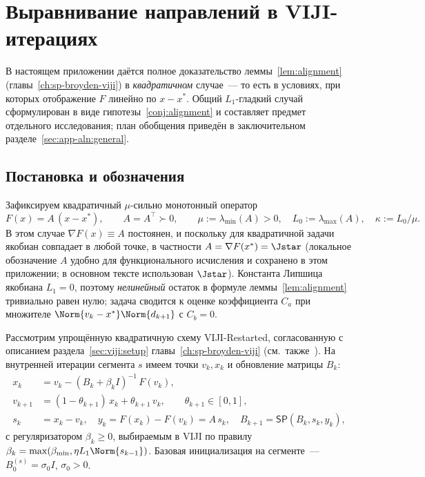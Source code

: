 \chapter{Выравнивание направлений в VIJI-итерациях}\label{app:alignment}

В настоящем приложении даётся полное доказательство
леммы~\ref{lem:alignment} (главы~\ref{ch:sp-broyden-viji})
в \emph{квадратичном} случае~--- то есть в условиях, при которых
отображение $F$ линейно по $x - x^{*}$. Общий $L_1$-гладкий случай
сформулирован в виде гипотезы~\ref{conj:alignment} и составляет
предмет отдельного исследования; план обобщения приведён в
заключительном разделе~\ref{sec:app-aln:general}.

\section{Постановка и обозначения}
\label{sec:app-aln:setup}

Зафиксируем квадратичный $\mu$-сильно монотонный оператор
\begin{equation}
F(x) = A\,(x - x^{*}),
\qquad
A = A^{\top} \succ 0,
\qquad
\mu := \lambda_{\min}(A) > 0,
\quad
L_0 := \lambda_{\max}(A),
\quad
\kappa := L_0/\mu.
\label{eq:app-aln:F}
\end{equation}
В этом случае $\nabla F(x) \equiv A$ постоянен, и поскольку для квадратичной задачи
якобиан совпадает в любой точке, в частности $A = \nabla F(x^{*}) = \Jstar$
(локальное обозначение $A$ удобно для функционального исчисления и сохранено
в этом приложении; в основном тексте использован $\Jstar$). Константа Липшица
якобиана $L_1 = 0$, поэтому \emph{нелинейный} остаток в формуле
леммы~\ref{lem:alignment} тривиально равен нулю; задача сводится к
оценке коэффициента $C_a$ при множителе $\Norm{v_k - x^{*}}\Norm{d_{k+1}}$
с $C_b = 0$.

Рассмотрим упрощённую квадратичную схему VIJI-Restarted, согласованную
с описанием раздела~\ref{sec:viji:setup} главы~\ref{ch:sp-broyden-viji}
(см.~также~\cite[Algorithm~1]{Agafonov2024VIJI}). На внутренней
итерации сегмента $s$ имеем точки $v_k, x_k$ и обновление матрицы $B_k$:
\begin{align}
x_k     &= v_k - (B_k + \beta_k I)^{-1}\, F(v_k), \label{eq:app-aln:x}\\
v_{k+1} &= (1 - \theta_{k+1})\, x_k + \theta_{k+1}\, v_k,
\qquad \theta_{k+1} \in [0, 1], \label{eq:app-aln:v}\\
s_k     &= x_k - v_k, \quad y_k = F(x_k) - F(v_k) = A\,s_k,
\quad B_{k+1} = \mathsf{SP}(B_k, s_k, y_k), \label{eq:app-aln:upd}
\end{align}
с регуляризатором $\beta_k \ge 0$, выбираемым в VIJI по правилу
$\beta_k = \max(\beta_{\min}, \eta L_1 \Norm{s_{k-1}})$.
Базовая инициализация на сегменте~--- $B_0^{(s)} = \sigma_0 I$, $\sigma_0 > 0$.

